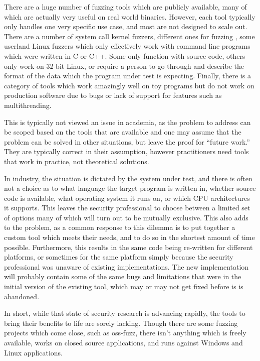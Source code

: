 There are a huge number of fuzzing tools which are publicly available, many of
which are actually very useful on real world binaries.  However, each tool
typically only handles one very specific use case, and most are not designed to scale
out.  There are a number of system call kernel fuzzers, different ones for
fuzzing \IOCTLs{}, some userland Linux fuzzers which only effectively work with
command line programs which were written in C or C++.  Some only function with
source code, others only work on 32-bit Linux, or require a person to go
through and describe the format of the data which the program under test is
expecting.  Finally, there is a category of tools which work amazingly well
on toy programs but do not work on production software due to bugs or lack of
support for features such as multithreading.

This is typically not viewed an issue in academia, as the problem to address can be
scoped based on the tools that are available and one may assume that the problem can
be solved in other situations, but leave the proof for ``future work.''  They
are typically correct in their assumption, however practitioners need tools
that work in practice, not theoretical solutions.

In industry, the situation is dictated by the system under test,
and there is often not a choice as to what language the target program is
written in, whether source code is available, what operating system it runs
on, or which CPU architectures it supports. This leaves the security
professional to choose between a limited set of options many of which will
turn out to be mutually exclusive. This also adds to the problem, as a common
response to this dilemma is to put together a custom tool which meets their
needs, and to do so in the shortest amount of time possible.  Furthermore,
this results in the same code being re-written for different platforms, or
sometimes for the same platform simply because the security professional was
unaware of existing implementations.  The new implementation will probably
contain some of the same bugs and limitations that were in the initial
version of the existing tool, which may or may not get fixed before is is
abandoned.

In short, while that state of security research is advancing rapidly, the
tools to bring their benefits to life are sorely lacking.  Though there are some
fuzzing projects which come close, such as oss-fuzz,\cite{ossfuzz} there
isn't anything which is freely available, works on closed source applications,
and runs against Windows and Linux applications.
